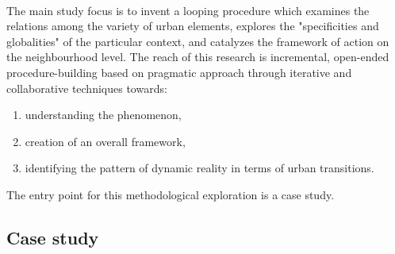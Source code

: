 \documentclass[11pt]{report}
\begin{document}
\\
The main study focus is to invent a looping procedure which examines the relations among the variety of urban elements, explores the "specificities and globalities" of the particular context, and catalyzes the framework of action on the neighbourhood level. The reach of this research is incremental, open-ended procedure-building based on pragmatic approach through iterative and collaborative techniques towards:
\begin{enumerate}
\item understanding the phenomenon,
\item creation of an overall framework,
\item identifying the pattern of dynamic reality in terms of urban transitions. 
\end{enumerate} 
The entry point for this methodological exploration is a case study.

\subsection{Case study}
\end{document}
